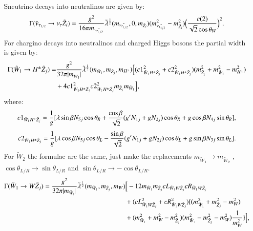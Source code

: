 \documentclass[final,3p,times]{elsarticle}
\begin{document}
Sneutrino decays into neutralinos are given by:
\begin{equation} \label{snutuanutauneutNMSSM}
\Gamma(\tilde{\nu}_{\tau_{1/2}} \rightarrow \nu_{\tau} \tilde{Z}_i) = {g^2 \over 16 \pi m_{\tilde{\nu_{\tau_{1/2}}}}} \tilde{\lambda}^{1 \over 2}(m_{\tilde{\nu_{\tau_{1/2}}}},0, m_{\tilde{Z}_i})(m_{\tilde{\nu_{\tau_{1/2}}}}^2 - m_{\tilde{Z}_i}^2)\Big({c(2) \over \sqrt{2} \cos\theta_W}\Big)^2.
\end{equation}
For chargino decays into neutralinos and charged Higgs bosons the partial width is given by:
\begin{equation} \label{chHpmneutNMSSM}
\begin{aligned}
\Gamma(\tilde{W}_1 \rightarrow H^{\pm} \tilde{Z}_j) = & {g^2 \over 32\pi |m_{\tilde{W}_1}|} \tilde{\lambda}^{1 \over 2}(m_{\tilde{W}_1},m_{\tilde{Z}_j},m_{H^{\pm}})\Big[({c1}_{\tilde{W}_1 H^{\pm} \tilde{Z}_j}^2 + {c2}_{\tilde{W}_1 H^{\pm} \tilde{Z}_j}^2)(m_{\tilde{Z}_j}^2 + m_{\tilde{W}_1}^2 - m_{H^{\pm}}^2) \\ & + 4{c1}_{\tilde{W}_1 H^{\pm} \tilde{Z}_j}^2 {c2}_{\tilde{W}_1 H^{\pm} \tilde{Z}_j}^2 m_{\tilde{Z}_j} m_{\tilde{W}_1}\Big],
\end{aligned}
\end{equation}
where:
\begin{equation}
{c1}_{\tilde{W}_1 H^{\pm} \tilde{Z}_j} = {1 \over g} [\lambda \sin\beta N_{5j} \cos\theta_R + {\cos\beta \over \sqrt{2}}(g' N_{1j} + gN_{2j})\cos\theta_R + g\cos\beta N_{4j} \sin\theta_R],
\end{equation}
\begin{equation}
{c2}_{\tilde{W}_1 H^{\pm} \tilde{Z}_j} = {1 \over g}[\lambda \cos\beta N_{5j} \cos\theta_L - {\sin\beta \over \sqrt{2}}(g' N_{1j} + gN_{2j})\cos\theta_L + g\sin\beta N_{3j}\sin\theta_L].
\end{equation}
For $\tilde{W}_2$ the formulae are the same, just make the replacements $m_{\tilde{W}_1} \rightarrow m_{\tilde{W}_2}$ , $\cos\theta_{L/R} \rightarrow \sin\theta_{L/R}$ and $\sin\theta_{L/R} \rightarrow -\cos\theta_{L/R}$.
\begin{equation} \label{chWneutNMSSM}
\begin{aligned}
\Gamma(\tilde{W}_1 \rightarrow W \tilde{Z}_j) = {g^2 \over 32\pi |m_{\tilde{W}_1}|} \tilde{\lambda}^{1 \over 2}(m_{\tilde{W}_1},m_{\tilde{Z}_j},m_{W}) &\Big[-12 m_{\tilde{W}_1} m_{\tilde{Z}_j} {cL}_{\tilde{W}_1 W \tilde{Z}_j} {cR}_{\tilde{W}_1 W \tilde{Z}_j} \\ & + ({cL}_{\tilde{W}_1 W \tilde{Z}_j}^2 + {cR}_{\tilde{W}_1 W \tilde{Z}_j}^2)	 \{(m_{\tilde{W}_1}^2 + m_{\tilde{Z}_j}^2 - m_{W}^2) \\ & + (m_{\tilde{W}_1}^2 + m_{W}^2 - m_{\tilde{Z}_j}^2)(m_{\tilde{W}_1}^2 - m_{\tilde{Z}_j}^2 - m_{W}^2){1 \over m_{W}^2}\}\Big],
\end{aligned}
\end{equation}
\end{document}
